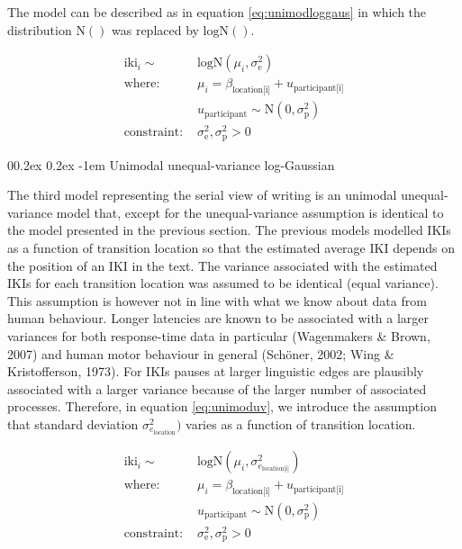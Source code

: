 \documentclass[
  english,
  man,floatsintext]{apa7}
\makeatletter
\let\oldparagraph\paragraph
\renewcommand{\paragraph}[1]{\oldparagraph{#1}\mbox{}}
\renewcommand{\paragraph}{\@startsection{paragraph}{4}{\parindent}%
  {0\baselineskip \@plus 0.2ex \@minus 0.2ex}%
  {-1em}%
  {\normalfont\normalsize\bfseries\itshape\typesectitle}}
\makeatother
\begin{document}
The model can be described as in equation \ref{eq:unimodloggaus} in which the distribution \(\text{N}()\) was replaced by \(\text{logN}()\).

\begin{equation}
\begin{aligned}
\label{eq:unimodloggaus}
\text{iki}_i \sim\text{ } & \text{logN}(\mu_i, \sigma_\text{e}^2) \\
\text{where: } &
\mu_i = \beta_\text{location[i]} + u_\text{participant[i]}\\
& u_\text{participant} \sim \text{N}(0, \sigma_\text{p}^2) \\
\text{constraint: } & \sigma_\text{e}^2, \sigma_\text{p}^2>0
\end{aligned}
\end{equation}

\hypertarget{unimodal-unequal-variance-log-gaussian}{%
\paragraph{Unimodal unequal-variance log-Gaussian}\label{unimodal-unequal-variance-log-gaussian}}

The third model representing the serial view of writing is an unimodal unequal-variance model that, except for the unequal-variance assumption is identical to the model presented in the previous section. The previous models modelled IKIs as a function of transition location so that the estimated average IKI depends on the position of an IKI in the text. The variance associated with the estimated IKIs for each transition location was assumed to be identical (equal variance). This assumption is however not in line with what we know about data from human behaviour. Longer latencies are known to be associated with a larger variances for both response-time data in particular (Wagenmakers \& Brown, 2007) and human motor behaviour in general (Schöner, 2002; Wing \& Kristofferson, 1973). For IKIs pauses at larger linguistic edges are plausibly associated with a larger variance because of the larger number of associated processes. Therefore, in equation \ref{eq:unimoduv}, we introduce the assumption that standard deviation \(\sigma_{e_\text{location}}^2)\) varies as a function of transition location.

\begin{equation}
\begin{aligned}
\label{eq:unimoduv}
\text{iki}_i \sim\text{ } & \text{logN}(\mu_i, \sigma_{e_\text{location[i]}}^2) \\
\text{where: } & \mu_i = \beta_\text{location[i]} + u_\text{participant[i]}\\
 & u_\text{participant} \sim \text{N}(0, \sigma_\text{p}^2) \\
 \text{constraint: } & \sigma_\text{e}^2, \sigma_\text{p}^2>0
\end{aligned}
\end{equation}
\end{document}
